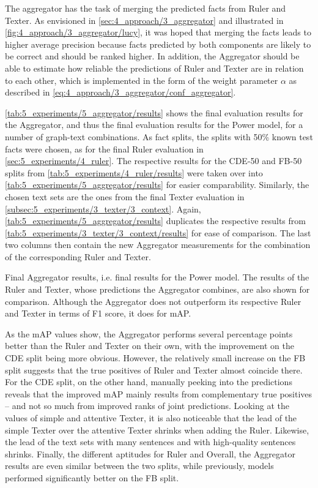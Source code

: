 The aggregator has the task of merging the predicted facts from Ruler and Texter. As envisioned in \autoref{sec:4_approach/3_aggregator} and illustrated in \autoref{fig:4_approach/3_aggregator/lucy}, it was hoped that merging the facts leads to higher average precision because facts predicted by both components are likely to be correct and should be ranked higher. In addition, the Aggregator should be able to estimate how reliable the predictions of Ruler and Texter are in relation to each other, which is implemented in the form of the weight parameter $\alpha$ as described in \autoref{eq:4_approach/3_aggregator/conf_aggregator}.

\autoref{tab:5_experiments/5_aggregator/results} shows the final evaluation results for the Aggregator, and thus the final evaluation results for the Power model, for a number of graph-text combinations. As fact splits, the splits with 50\% known test facts were chosen, as for the final Ruler evaluation in \autoref{sec:5_experiments/4_ruler}. The respective results for the CDE-50 and FB-50 splits from \autoref{tab:5_experiments/4_ruler/results} were taken over into \autoref{tab:5_experiments/5_aggregator/results} for easier comparability. Similarly, the chosen text sets are the ones from the final Texter evaluation in \autoref{subsec:5_experiments/3_texter/3_context}. Again, \autoref{tab:5_experiments/5_aggregator/results} duplicates the respective results from \autoref{tab:5_experiments/3_texter/3_context/results} for ease of comparison. The last two columns then contain the new Aggregator measurements for the combination of the corresponding Ruler and Texter.

\begin{table}[t]
    \makebox[\textwidth][c]{
        
    }
    \caption{Final Aggregator results, i.e. final results for the Power model. The results of the Ruler and Texter, whose predictions the Aggregator combines, are also shown for comparison. Although the Aggregator does not outperform its respective Ruler and Texter in terms of F1 score, it does for mAP.}
    \label{tab:5_experiments/5_aggregator/results}
\end{table}

As the mAP values show, the Aggregator performs several percentage points better than the Ruler and Texter on their own, with the improvement on the CDE split being more obvious. However, the relatively small increase on the FB split suggests that the true positives of Ruler and Texter almost coincide there. For the CDE split, on the other hand, manually peeking into the predictions reveals that the improved mAP mainly results from complementary true positives -- and not so much from improved ranks of joint predictions. Looking at the values of simple and attentive Texter, it is also noticeable that the lead of the simple Texter over the attentive Texter shrinks when adding the Ruler. Likewise, the lead of the text sets with many sentences and with high-quality sentences shrinks. Finally, the different aptitudes for Ruler and Overall, the Aggregator results are even similar between the two splits, while previously, models performed significantly better on the FB split.

